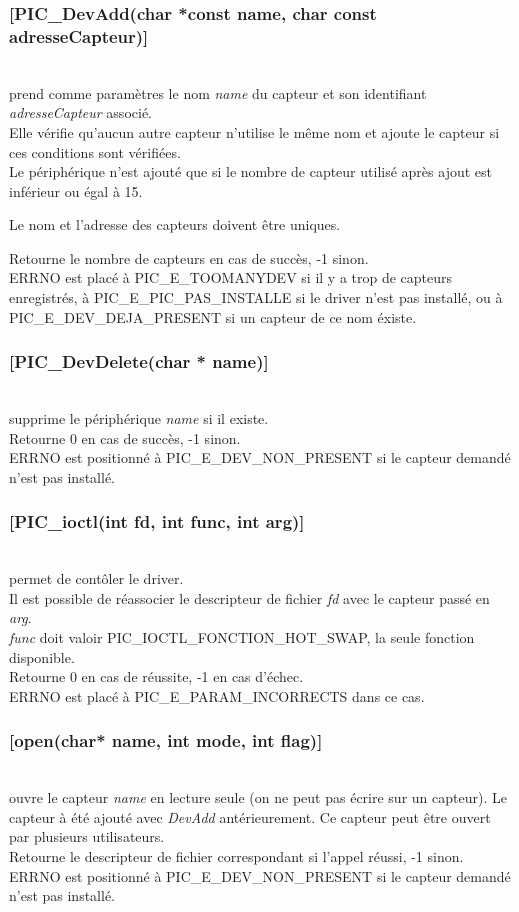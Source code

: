  \subsubsection{[PIC\_DevAdd(char *const name, char const adresseCapteur)]} \hfill\\
 prend comme paramètres le nom \textsl{name} du capteur et son identifiant \textsl{adresseCapteur} associé.\\
 Elle vérifie qu'aucun autre 
capteur n'utilise le même nom et ajoute le capteur
 si ces conditions sont vérifiées.\\
Le périphérique n'est ajouté que si le nombre de capteur utilisé après ajout
 est inférieur ou égal à 15.

Le nom et l'adresse des capteurs doivent être uniques.

Retourne le nombre de capteurs en cas de succès, -1 sinon.\\
ERRNO est placé à PIC\_E\_TOOMANYDEV si il y a trop de capteurs
 enregistrés, à PIC\_E\_PIC\_PAS\_INSTALLE si le driver n'est pas installé,
ou à PIC\_E\_DEV\_DEJA\_PRESENT si un capteur de ce nom éxiste.

 \subsubsection{[PIC\_DevDelete(char * name)]} \hfill\\
supprime le périphérique \textsl{name} si il existe.\\
Retourne 0 en cas de succès, -1 sinon.\\
ERRNO est positionné à PIC\_E\_DEV\_NON\_PRESENT si le capteur demandé 
n'est pas installé.

\subsubsection{[PIC\_ioctl(int fd, int func, int arg)]} \hfill\\
permet de contôler le driver.\\
Il est possible de réassocier le descripteur de fichier \textsl{fd} avec le capteur passé en \textsl{arg}.\\
\textsl{func} doit valoir PIC\_IOCTL\_FONCTION\_HOT\_SWAP, la seule fonction disponible.\\
Retourne 0 en cas de réussite, -1 en cas d'échec.\\
ERRNO est placé à PIC\_E\_PARAM\_INCORRECTS dans ce cas.

\subsubsection{[open(char* name, int mode, int flag)]} \hfill\\
ouvre le capteur \textsl{name} en lecture seule (on ne peut pas écrire
sur un capteur).
Le capteur à été ajouté avec \textsl{DevAdd} antérieurement.
 Ce capteur peut être ouvert par plusieurs utilisateurs.\\
Retourne le descripteur de fichier correspondant si l'appel réussi, -1 sinon.\\
ERRNO est positionné à PIC\_E\_DEV\_NON\_PRESENT si le capteur demandé 
n'est pas installé.

